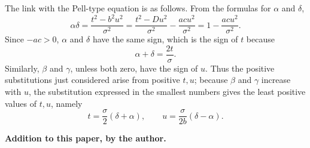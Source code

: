 \documentclass[11pt]{article}
\begin{document}
The link with the Pell-type equation is as follows. From the formulas for $\alpha$ and $\delta$,
\[
 \alpha\delta=\frac{t^2-b^2u^2}{\sigma^2}
 =\frac{t^2-Du^2}{\sigma^2}-\frac{ac u^2}{\sigma^2}
 =1-
\frac{ac u^2}{\sigma^2}.
\]
Since $-ac>0$, $\alpha$ and $\delta$ have the same sign, which is the sign of $t$ because
\[
 \alpha+
\delta=\frac{2t}{\sigma}.
\]
Similarly, $\beta$ and $\gamma$, unless both zero, have the sign of $u$. Thus the positive substitutions just considered arise from positive $t,u$; because $\beta$ and $\gamma$ increase with $u$, the substitution expressed in the smallest numbers gives the least positive values of $t,u$, namely
\[
 t=\frac{\sigma}{2}(\delta+
\alpha),
 \qquad
 u=\frac{\sigma}{2b}(\delta-
\alpha).
\]


\begin{center}
\textbf{Addition to this paper, by the author.}
\end{center}
\end{document}
